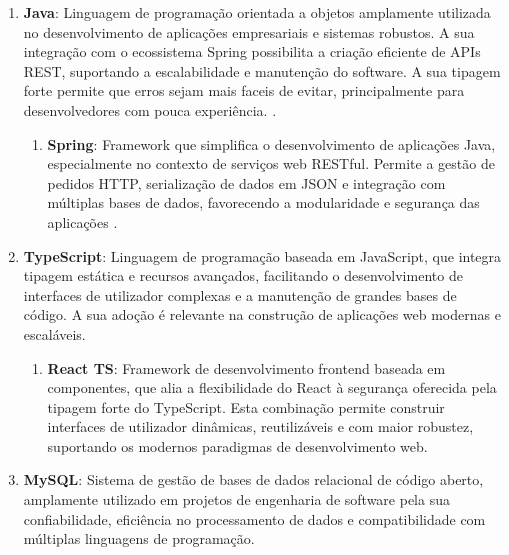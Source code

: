 \begin{enumerate}
    \item \textbf{Java}: Linguagem de programação orientada a objetos amplamente utilizada no desenvolvimento de aplicações empresariais e sistemas robustos. A sua integração com o ecossistema Spring possibilita a criação eficiente de APIs REST, suportando a escalabilidade e manutenção do software. A sua tipagem forte permite que erros sejam mais faceis de evitar, principalmente para desenvolvedores com pouca experiência.  \cite{spring-rest-intro,geeksforgeeks-rest,spring-guides}.
        \begin{enumerate}
            \item \textbf{Spring}: Framework que simplifica o desenvolvimento de aplicações Java, especialmente no contexto de serviços web RESTful. Permite a gestão de pedidos HTTP, serialização de dados em JSON e integração com múltiplas bases de dados, favorecendo a modularidade e segurança das aplicações \cite{spring-rest-intro,geeksforgeeks-rest,spring-guides}.
        \end{enumerate}
    \item \textbf{TypeScript}: Linguagem de programação baseada em JavaScript, que integra tipagem estática e recursos avançados, facilitando o desenvolvimento de interfaces de utilizador complexas e a manutenção de grandes bases de código. A sua adoção é relevante na construção de aplicações web modernas e escaláveis.
    \begin{enumerate}
        \item \textbf{React TS}: Framework de desenvolvimento frontend baseada em componentes, que alia a flexibilidade do React à segurança oferecida pela tipagem forte do TypeScript. Esta combinação permite construir interfaces de utilizador dinâmicas, reutilizáveis e com maior robustez, suportando os modernos paradigmas de desenvolvimento web.
    \end{enumerate}
    \item \textbf{MySQL}: Sistema de gestão de bases de dados relacional de código aberto, amplamente utilizado em projetos de engenharia de software pela sua confiabilidade, eficiência no processamento de dados e compatibilidade com múltiplas linguagens de programação.
\end{enumerate}


